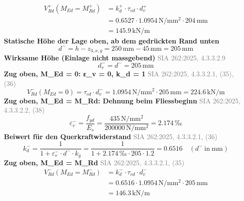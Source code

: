 \documentclass[11pt,a4paper]{article}
\newcommand{\normref}[1]{{\small\textcolor{gray}{#1}}}
\begin{document}
\begin{equation*}
\begin{aligned}
  V_{Rd}^{+}(M_{Ed} = M_{Rd}^{+}) &= k_d^{+} \cdot \tau_{cd} \cdot d_v^{+} \\
  &= 0.6527 \cdot 1.0954\,\mathrm{N}/\mathrm{mm}^{2} \cdot 204\,\mathrm{mm} \\
  &= 145.9\,\mathrm{kN}/\mathrm{m}
\end{aligned}
\end{equation*}
\noindent\textbf{Statische Höhe der Lage oben, ab dem gedrückten Rand unten}
\begin{equation*}
d^{-} = h - z_{3,x,g} = 250\,\mathrm{mm} - 45\,\mathrm{mm} = 205\,\mathrm{mm}
\end{equation*}
\noindent\textbf{Wirksame Höhe (Einlage nicht massgebend)} \hfill \normref{SIA 262:2025, 4.3.3.2.9}
\begin{equation*}
d_v^{-} = d^{-} = 205\,\mathrm{mm}
\end{equation*}
\noindent\textbf{Zug oben, M\_Ed = 0: ε\_v = 0, k\_d = 1} \hfill \normref{SIA 262:2025, 4.3.3.2.1, (35), (36)}
\begin{equation*}
V_{Rd}^{-}(M_{Ed} = 0) = \tau_{cd} \cdot d_v^{-} = 1.0954\,\mathrm{N}/\mathrm{mm}^{2} \cdot 205\,\mathrm{mm} = 224.6\,\mathrm{kN}/\mathrm{m}
\end{equation*}
\noindent\textbf{Zug oben, M\_Ed = M\_Rd: Dehnung beim Fliessbeginn} \hfill \normref{SIA 262:2025, 4.3.3.2.2, (38)}
\begin{equation*}
\varepsilon_v^{-} = \frac{f_{yd}}{E_s} = \frac{435\,\mathrm{N}/\mathrm{mm}^{2}}{200000\,\mathrm{N}/\mathrm{mm}^{2}} = 2.174\,\text{‰}
\end{equation*}
\noindent\textbf{Beiwert für den Querkraftwiderstand} \hfill \normref{SIA 262:2025, 4.3.3.2.1, (36)}
\begin{equation*}
k_d^{-} = \frac{1}{1 + \varepsilon_v^{-} \cdot d^{-} \cdot k_g} = \frac{1}{1 + 2.174\,\text{‰} \cdot 205 \cdot 1.2} = 0.6516 \quad \left(d^{-}\ \text{in}\ \mathrm{mm}\right)
\end{equation*}
\noindent\textbf{Zug oben, M\_Ed = M\_Rd} \hfill \normref{SIA 262:2025, 4.3.3.2.1, (35)}
\begin{equation*}
\begin{aligned}
  V_{Rd}^{-}(M_{Ed} = M_{Rd}^{-}) &= k_d^{-} \cdot \tau_{cd} \cdot d_v^{-} \\
  &= 0.6516 \cdot 1.0954\,\mathrm{N}/\mathrm{mm}^{2} \cdot 205\,\mathrm{mm} \\
  &= 146.3\,\mathrm{kN}/\mathrm{m}
\end{aligned}
\end{equation*}
\end{document}

